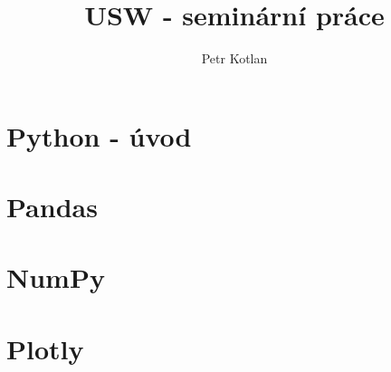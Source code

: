 \documentclass[a4paper, 12pt]{article}
\title{USW - seminární práce}
\author{Petr Kotlan}
\date{}
\begin{document}
\maketitle

\section{Python - úvod}

\section{Pandas}

\section{NumPy}

\section{Plotly}
\end{document}
